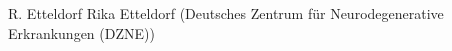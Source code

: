 
                {R.  Etteldorf}
                {Rika Etteldorf (Deutsches Zentrum für Neurodegenerative Erkrankungen (DZNE))}
                